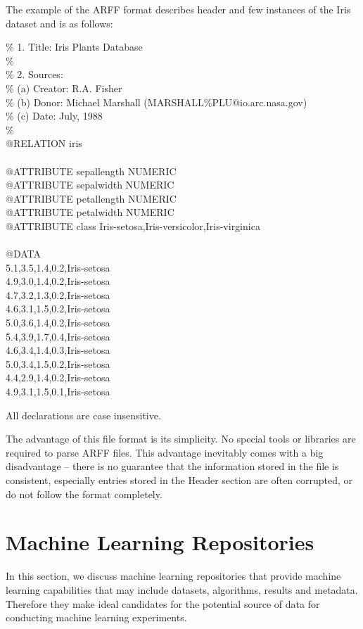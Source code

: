 The example of the ARFF format describes header and few instances of the Iris dataset \cite{iris} and is as follows: 
\begin{shaded}
	\noindent \% 1. Title: Iris Plants Database \\
	\% \\
	\% 2. Sources: \\
	\%      (a) Creator: R.A. Fisher \\
	\%      (b) Donor: Michael Marshall (MARSHALL\%PLU@io.arc.nasa.gov) \\
	\%      (c) Date: July, 1988 \\
	\% \\
	@RELATION iris \\
	\\
	@ATTRIBUTE sepallength  NUMERIC \\
	@ATTRIBUTE sepalwidth   NUMERIC \\
	@ATTRIBUTE petallength  NUMERIC \\
	@ATTRIBUTE petalwidth   NUMERIC \\
	@ATTRIBUTE class        {Iris-setosa,Iris-versicolor,Iris-virginica} \\
	\\
	@DATA \\
	5.1,3.5,1.4,0.2,Iris-setosa \\
	4.9,3.0,1.4,0.2,Iris-setosa \\
	4.7,3.2,1.3,0.2,Iris-setosa \\
	4.6,3.1,1.5,0.2,Iris-setosa \\
	5.0,3.6,1.4,0.2,Iris-setosa \\
	5.4,3.9,1.7,0.4,Iris-setosa \\
	4.6,3.4,1.4,0.3,Iris-setosa \\
	5.0,3.4,1.5,0.2,Iris-setosa \\
	4.4,2.9,1.4,0.2,Iris-setosa \\
	4.9,3.1,1.5,0.1,Iris-setosa 
\end{shaded}

All declarations are case insensitive.

The advantage of this file format is its simplicity. No special tools or libraries are required to parse ARFF files. This advantage inevitably comes with a big disadvantage -- there is no guarantee that the information stored in the file is consistent, especially entries stored in the Header section are often corrupted, or do not follow the format completely. 

\section{Machine Learning Repositories}
In this section, we discuss machine learning repositories that provide machine learning capabilities that may include datasets, algorithms, results and metadata. Therefore they make ideal candidates for the potential source of data for conducting machine learning experiments.

